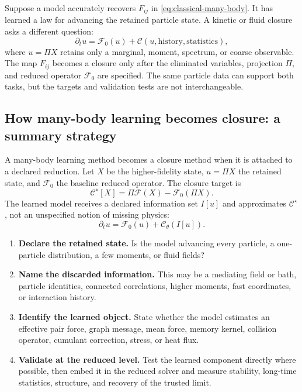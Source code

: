\begin{bigidea}
Suppose a model accurately recovers \(F_{ij}\) in \cref{eq:classical-many-body}. It has learned a law for advancing the retained particle state. A kinetic or fluid closure asks a different question:
\[
\partial_t u=\mathcal F_0(u)+\mathcal C(u,\text{history},\text{statistics}),
\]
where \(u=\Pi X\) retains only a marginal, moment, spectrum, or coarse observable. The map \(F_{ij}\) becomes a closure only after the eliminated variables, projection \(\Pi\), and reduced operator \(\mathcal F_0\) are specified. The same particle data can support both tasks, but the targets and validation tests are not interchangeable.
\end{bigidea}

\subsection{How many-body learning becomes closure: a summary strategy}

A many-body learning method becomes a closure method when it is attached to a declared reduction. Let \(X\) be the higher-fidelity state, \(u=\Pi X\) the retained state, and \(\mathcal F_0\) the baseline reduced operator. The closure target is
\begin{equation}
\mathcal C^\star[X]
=
\Pi\mathcal F(X)-\mathcal F_0(\Pi X).
\label{eq:many-body-closure-target}
\end{equation}
The learned model receives a declared information set \(I[u]\) and approximates \(\mathcal C^\star\), not an unspecified notion of missing physics:
\begin{equation}
\partial_t u
=
\mathcal F_0(u)
+\mathcal C_\theta\!\left(I[u]\right).
\label{eq:many-body-learned-closure}
\end{equation}

\begin{takeaway}
\begin{enumerate}
  \item \textbf{Declare the retained state.} Is the model advancing every particle, a one-particle distribution, a few moments, or fluid fields?
  \item \textbf{Name the discarded information.} This may be a mediating field or bath, particle identities, connected correlations, higher moments, fast coordinates, or interaction history.
  \item \textbf{Identify the learned object.} State whether the model estimates an effective pair force, graph message, mean force, memory kernel, collision operator, cumulant correction, stress, or heat flux.
  \item \textbf{Validate at the reduced level.} Test the learned component directly where possible, then embed it in the reduced solver and measure stability, long-time statistics, structure, and recovery of the trusted limit.
\end{enumerate}
\end{takeaway}

